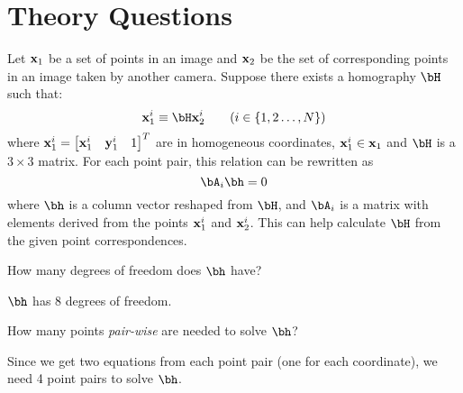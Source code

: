 \section{Theory Questions}
\label{sec:theory-questions}


Let $\mathbf{x}_1$ be a set of points in an image and $\mathbf{x}_2$ be the set of
corresponding points in an image taken by another camera.
Suppose there exists a homography $\bH$ such that:
\[ \bx_1^i \equiv \bH \bx_2^i \qquad (i \in \set{1, 2 \ldots, N}) \]
where $\mathbf{x}_1^i = \begin{bmatrix} \mathbf{x}_1^i & \mathbf{y}_1^i & 1 \end{bmatrix}^T$ are in
homogeneous coordinates, $\mathbf{x}_1^i \in \mathbf{x}_1$ and $\bH$ is a
$3 \times 3$ matrix.
For each point pair, this relation can be rewritten as
\[ \bA_i \bh = 0 \] where $\bh$ is a column vector reshaped from $\bH$,
and $\bA_i$ is a matrix with elements derived from the points
$\mathbf{x}_1^i$ and $\mathbf{x}_2^i$.
This can help calculate $\bH$ from the given point correspondences.

\begin{problem}
  How many degrees of freedom does $\bh$ have?

  \begin{answer}
    $\bh$ has 8 degrees of freedom.
  \end{answer}
\end{problem}

\begin{problem}
  How many points \emph{pair-wise} are needed to solve $\bh$?

  \begin{answer}
    Since we get two equations from each point pair
    (one for each coordinate), we need 4 point pairs to solve $\bh$.
  \end{answer}
\end{problem}

